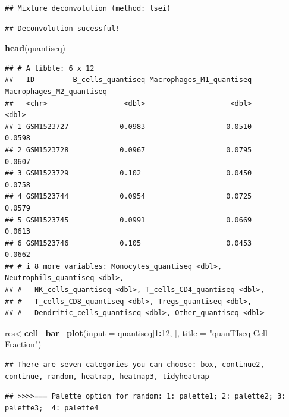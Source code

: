 \documentclass[
  12pt,
]{book}
\newenvironment{Shaded}{\begin{snugshade}}{\end{snugshade}}
\newcommand{\AttributeTok}[1]{\textcolor[rgb]{0.13,0.29,0.53}{#1}}
\newcommand{\DecValTok}[1]{\textcolor[rgb]{0.00,0.00,0.81}{#1}}
\newcommand{\FunctionTok}[1]{\textcolor[rgb]{0.13,0.29,0.53}{\textbf{#1}}}
\newcommand{\NormalTok}[1]{#1}
\newcommand{\OtherTok}[1]{\textcolor[rgb]{0.56,0.35,0.01}{#1}}
\newcommand{\SpecialCharTok}[1]{\textcolor[rgb]{0.81,0.36,0.00}{\textbf{#1}}}
\newcommand{\StringTok}[1]{\textcolor[rgb]{0.31,0.60,0.02}{#1}}
\theoremstyle{definition}
\theoremstyle{definition}
\theoremstyle{definition}
\theoremstyle{definition}
\theoremstyle{remark}
\begin{document}
\begin{verbatim}
## Mixture deconvolution (method: lsei)
\end{verbatim}

\begin{verbatim}
## Deconvolution sucessful!
\end{verbatim}

\begin{Shaded}
\begin{Highlighting}[]
\FunctionTok{head}\NormalTok{(quantiseq)}
\end{Highlighting}
\end{Shaded}

\begin{verbatim}
## # A tibble: 6 x 12
##   ID         B_cells_quantiseq Macrophages_M1_quantiseq Macrophages_M2_quantiseq
##   <chr>                  <dbl>                    <dbl>                    <dbl>
## 1 GSM1523727            0.0983                   0.0510                   0.0598
## 2 GSM1523728            0.0967                   0.0795                   0.0607
## 3 GSM1523729            0.102                    0.0450                   0.0758
## 4 GSM1523744            0.0954                   0.0725                   0.0579
## 5 GSM1523745            0.0991                   0.0669                   0.0613
## 6 GSM1523746            0.105                    0.0453                   0.0662
## # i 8 more variables: Monocytes_quantiseq <dbl>, Neutrophils_quantiseq <dbl>,
## #   NK_cells_quantiseq <dbl>, T_cells_CD4_quantiseq <dbl>,
## #   T_cells_CD8_quantiseq <dbl>, Tregs_quantiseq <dbl>,
## #   Dendritic_cells_quantiseq <dbl>, Other_quantiseq <dbl>
\end{verbatim}

\begin{Shaded}
\begin{Highlighting}[]
\NormalTok{res}\OtherTok{\textless{}{-}}\FunctionTok{cell\_bar\_plot}\NormalTok{(}\AttributeTok{input =}\NormalTok{ quantiseq[}\DecValTok{1}\SpecialCharTok{:}\DecValTok{12}\NormalTok{, ], }\AttributeTok{title =} \StringTok{"quanTIseq Cell Fraction"}\NormalTok{)}
\end{Highlighting}
\end{Shaded}

\begin{verbatim}
## There are seven categories you can choose: box, continue2, continue, random, heatmap, heatmap3, tidyheatmap
\end{verbatim}

\begin{verbatim}
## >>>>=== Palette option for random: 1: palette1; 2: palette2; 3: palette3;  4: palette4
\end{verbatim}
\end{document}
